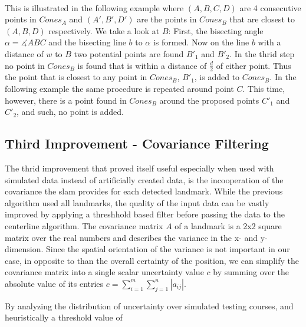 \\This is illustrated in the following example where $(A,B,C,D)$ are 4 consecutive points in $Cones_A$ and $(A',B',D')$ are the points in $Cones_B$ that are closest to $(A,B,D)$ respectively.
We take a look at $B$: First, the bisecting angle $\alpha =\measuredangle  ABC$ and the bisecting line $b$ to $\alpha$ is formed. Now on the line $b$ with a distance of $w$ to $B$ two potential points are found $B'_1$ and $B'_2$. In the thrid step no point in $Cones_B$ is found that is within a distance of $\frac{d}{2}$ of either point. Thus the point that is closest to any point in $Cones_B$, $B'_1$, is added to $Cones_B$.
In the following example the same procedure is repeated around point $C$.
 This time, however, there is a point found in $Cones_B$ around the proposed points $C'_1$ and $C'_2$, and such, no point is added.
\subsection{Third Improvement - Covariance Filtering}
The thrid improvement that proved itself useful especially when used with simulated data instead of artificially created data, is the incooperation of the covariance the \ac{slam} provides for each detected landmark. While the previous algorithm used all landmarks, the quality of the input data can be vastly improved by applying a threshhold based filter before passing the data to the centerline algorithm. The covariance matrix $A$ of a landmark is a 2x2 square matrix over the real numbers and describes the variance in the x- and y-dimension. Since the spatial orientation of the variance is not important in our case, in opposite to than the overall certainty of the position, we can simplify the covariance matrix into a single scalar uncertainty value $c$ by summing over the absolute value of its entries $c = \sum_{i=1}^m \sum_{j=1}^n |a_{ij}|$.

By analyzing the distribution of uncertainty over simulated testing courses, and heuristically a threshold value of


